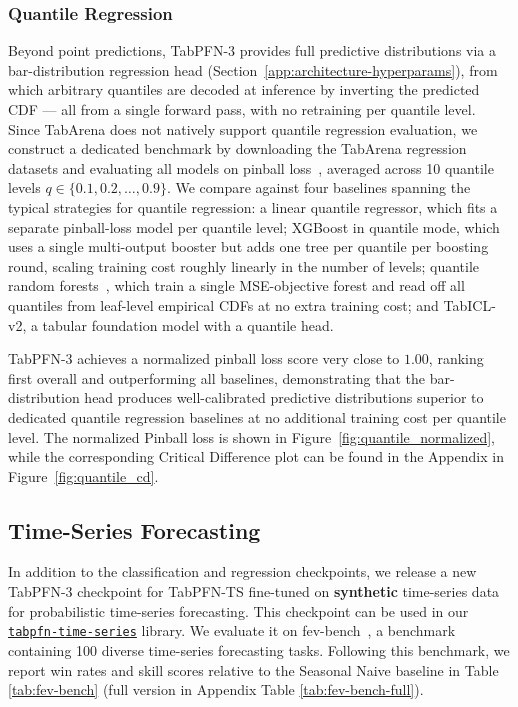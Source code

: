 \subsubsection{Quantile Regression}
\label{sec:quantile_regression}

Beyond point predictions, TabPFN-3 provides full predictive distributions via a
bar-distribution regression head (Section~\ref{app:architecture-hyperparams}), from
which arbitrary quantiles are decoded at inference by inverting the predicted CDF ---
all from a single forward pass, with no retraining per quantile level. Since TabArena does not natively support quantile regression evaluation, we construct
a dedicated benchmark by downloading the TabArena regression datasets and evaluating
all models on pinball loss~\cite{koenker_regression_quantiles}, averaged across 10
quantile levels $q \in \{0.1, 0.2, \ldots, 0.9\}$. We compare against four baselines spanning the typical strategies for quantile regression: a linear quantile regressor, which fits a separate pinball-loss model per quantile level; XGBoost in quantile mode, which uses a single multi-output booster but adds one tree per quantile per boosting round, scaling training cost roughly linearly in the number of levels; quantile random forests~\cite{meinshausen2006qrf}, which train a single MSE-objective forest and read off all quantiles from leaf-level empirical CDFs at no extra training cost; and TabICL-v2, a tabular foundation model with a quantile head.

TabPFN-3 achieves a normalized pinball loss score very close to $1.00$, ranking first overall
and outperforming all baselines, demonstrating that the bar-distribution head produces
well-calibrated predictive distributions superior to dedicated quantile regression
baselines at no additional training cost per quantile level. The normalized Pinball loss is shown in Figure~\ref{fig:quantile_normalized}, while the corresponding Critical Difference plot can be found in the Appendix in Figure~\ref{fig:quantile_cd}.
\FloatBarrier

\subsection{Time-Series Forecasting}\label{subsec:results_ts}

In addition to the classification and regression checkpoints, we
release a new TabPFN-3 checkpoint for TabPFN-TS \citep{hoo2024tabpfn_ts} fine-tuned on \textbf{synthetic} time-series data for
probabilistic time-series forecasting. This checkpoint can be used in our \href{https://github.com/PriorLabs/tabpfn-time-series}{\texttt{tabpfn-time-series}} library. We evaluate it on fev-bench~\citep{shchur2025fev}, a benchmark containing 100 diverse time-series forecasting tasks.
Following this benchmark, we report win rates and skill scores relative to the Seasonal Naive baseline in Table \ref{tab:fev-bench} (full version in Appendix Table \ref{tab:fev-bench-full}).

